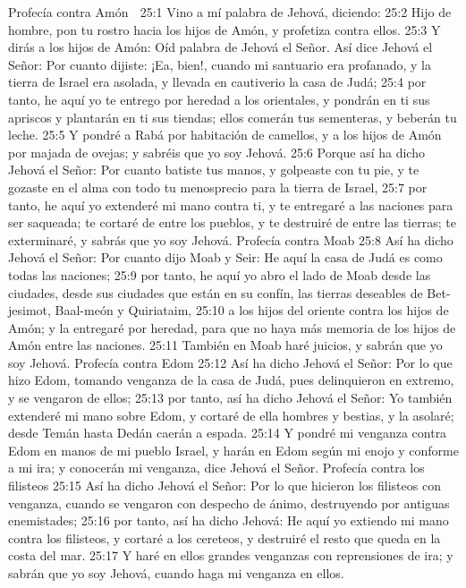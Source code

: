 Profecía contra Amón  

25:1 Vino a mí palabra de Jehová, diciendo:  
25:2 Hijo de hombre, pon tu rostro hacia los hijos de Amón,  y profetiza contra ellos.  
25:3 Y dirás a los hijos de Amón: Oíd palabra de Jehová el Señor. Así dice Jehová el Señor: Por cuanto dijiste: ¡Ea, bien!, cuando mi santuario era profanado, y la tierra de Israel era asolada, y llevada en cautiverio la casa de Judá; 
25:4 por tanto, he aquí yo te entrego por heredad a los orientales, y pondrán en ti sus apriscos y plantarán en ti sus tiendas; ellos comerán tus sementeras, y beberán tu leche.  
25:5 Y pondré a Rabá por habitación de camellos, y a los hijos de Amón por majada de ovejas; y sabréis que yo soy Jehová.  
25:6 Porque así ha dicho Jehová el Señor: Por cuanto batiste tus manos, y golpeaste con tu pie, y te gozaste en el alma con todo tu menosprecio para la tierra de Israel,  
25:7 por tanto, he aquí yo extenderé mi mano contra ti, y te entregaré a las naciones para ser saqueada; te cortaré de entre los pueblos, y te destruiré de entre las tierras; te exterminaré, y sabrás que yo soy Jehová.  
Profecía contra Moab  
25:8 Así ha dicho Jehová el Señor: Por cuanto dijo Moab  y Seir: He aquí la casa de Judá es como todas las naciones;  
25:9 por tanto, he aquí yo abro el lado de Moab desde las ciudades, desde sus ciudades que están en su confín, las tierras deseables de Bet-jesimot, Baal-meón y Quiriataim,  
25:10 a los hijos del oriente contra los hijos de Amón; y la entregaré por heredad, para que no haya más memoria de los hijos de Amón entre las naciones.  
25:11 También en Moab haré juicios, y sabrán que yo soy Jehová.  
Profecía contra Edom  
25:12 Así ha dicho Jehová el Señor: Por lo que hizo Edom, tomando venganza de la casa de Judá, pues delinquieron en extremo, y se vengaron de ellos;  
25:13 por tanto, así ha dicho Jehová el Señor: Yo también extenderé mi mano sobre Edom, y cortaré de ella hombres y bestias, y la asolaré; desde Temán hasta Dedán caerán a espada.  
25:14 Y pondré mi venganza contra Edom en manos de mi pueblo Israel, y harán en Edom según mi enojo y conforme a mi ira; y conocerán mi venganza, dice Jehová el Señor.  
Profecía contra los filisteos  
25:15 Así ha dicho Jehová el Señor: Por lo que hicieron los filisteos con venganza, cuando se vengaron con despecho de ánimo, destruyendo por antiguas enemistades;  
25:16 por tanto, así ha dicho Jehová: He aquí yo extiendo mi mano contra los filisteos, y cortaré a los cereteos, y destruiré el resto que queda en la costa del mar.  
25:17 Y haré en ellos grandes venganzas con reprensiones de ira; y sabrán que yo soy Jehová, cuando haga mi venganza en ellos.  

